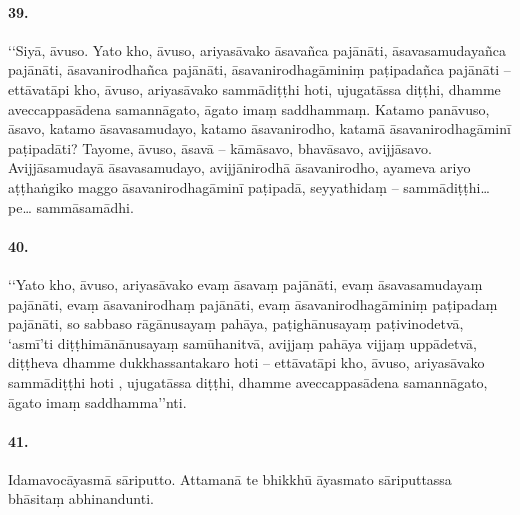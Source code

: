 \paragraph{39.} ‘‘Siyā, āvuso. Yato kho, āvuso, ariyasāvako āsavañca pajānāti, āsavasamudayañca pajānāti, āsavanirodhañca pajānāti, āsavanirodhagāminiṃ paṭipadañca pajānāti – ettāvatāpi kho, āvuso, ariyasāvako sammādiṭṭhi hoti, ujugatāssa diṭṭhi, dhamme aveccappasādena samannāgato, āgato imaṃ saddhammaṃ. Katamo panāvuso, āsavo, katamo āsavasamudayo, katamo āsavanirodho, katamā āsavanirodhagāminī paṭipadāti? Tayome, āvuso, āsavā – kāmāsavo, bhavāsavo, avijjāsavo. Avijjāsamudayā āsavasamudayo, avijjānirodhā āsavanirodho, ayameva ariyo aṭṭhaṅgiko maggo āsavanirodhagāminī paṭipadā, seyyathidaṃ – sammādiṭṭhi…pe… sammāsamādhi.

\paragraph{40.} ‘‘Yato kho, āvuso, ariyasāvako evaṃ āsavaṃ pajānāti, evaṃ āsavasamudayaṃ pajānāti, evaṃ āsavanirodhaṃ pajānāti, evaṃ āsavanirodhagāminiṃ paṭipadaṃ pajānāti, so sabbaso rāgānusayaṃ pahāya, paṭighānusayaṃ paṭivinodetvā, ‘asmī’ti diṭṭhimānānusayaṃ samūhanitvā, avijjaṃ pahāya vijjaṃ uppādetvā, diṭṭheva dhamme dukkhassantakaro hoti – ettāvatāpi kho, āvuso, ariyasāvako sammādiṭṭhi hoti , ujugatāssa diṭṭhi, dhamme aveccappasādena samannāgato, āgato imaṃ saddhamma’’nti.

\paragraph{41.} Idamavocāyasmā sāriputto. Attamanā te bhikkhū āyasmato sāriputtassa bhāsitaṃ abhinandunti.

